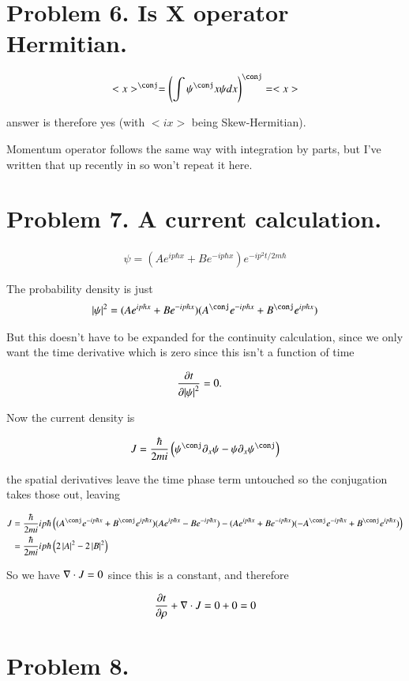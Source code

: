\documentclass{article}
\begin{document}
\section{ Problem 6. Is X operator Hermitian. }

\begin{align*}
<x>^\conj = \left(\int \psi^\conj x \psi dx\right)^\conj = <x>
\end{align*}

answer is therefore yes (with $<ix>$ being Skew-Hermitian).

Momentum operator follows the same way with integration by parts, but I've
written that up recently in \cite{PJQmSusskind} so won't repeat it here.

\section{ Problem 7. A current calculation. }

\begin{align*}
\psi = (A e^{ip\hbar x} + B e^{-ip\hbar x})e^{-i p^2 t/2 m\hbar}
\end{align*}

The probability density is just
\begin{align*}
\Abs{\psi}^2 
&= (A e^{ip\hbar x} + B e^{-ip\hbar x}) (A^\conj e^{-ip\hbar x} + B^\conj e^{ip\hbar x}) \\
\end{align*}

But this doesn't have to be expanded for the continuity calculation, since we only want the time
derivative which is zero since this isn't a function of time

\begin{align*}
\frac{\partial{t}}{\partial {\left\lvert{\psi}\right\rvert^2}} &= 0.
\end{align*}

Now the current density is

\begin{align*}
J = \frac{\hbar}{2mi}\left( \psi^\conj \partial_x \psi - \psi \partial_x \psi^\conj \right)
\end{align*}

the spatial derivatives leave the time phase term untouched so the conjugation takes those out, leaving

\begin{align*}
J 
&= \frac{\hbar}{2mi}
i p \hbar \left((A^\conj e^{-ip\hbar x} + B^\conj e^{ip\hbar x}) (A e^{ip\hbar x} - B e^{-ip\hbar x}) 
-(A e^{ip\hbar x} + B e^{-ip\hbar x}) (-A^\conj e^{-ip\hbar x} + B^\conj e^{ip\hbar x}) \right) \\
&= \frac{\hbar}{2mi} i p \hbar \left( 2 \Abs{A}^2 - 2\Abs{B}^2\right) \\
\end{align*}

So we have $\nabla \cdot J = 0$ since this is a constant, and therefore

\begin{align*}
\frac{\partial{t}}{\partial {\rho}} + \nabla \cdot J = 0 + 0 = 0
\end{align*}

\section{ Problem 8. }



\end{document}
